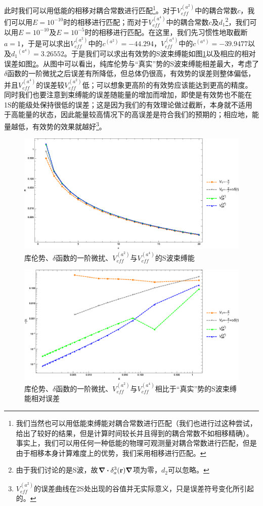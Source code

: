 \documentclass[cs4size,titlepage,twoside]{ctexart}
\begin{document}
此时我们可以用低能的相移对耦合常数进行匹配\footnote{我们当然也可以用低能束缚能对耦合常数进行匹配（我们也进行过这种尝试，给出了较好的结果，但是计算时间较长并且得到的耦合常数不如相移精确）。事实上，我们可以用任何一种低能的物理可观测量对耦合常数进行匹配，但是由于相移本身计算难度上的优势，我们采用相移进行匹配。}。对于$V_{eff}^{(a^2)}$中的耦合常数$c$，我们可以用$E=10^{-10}$时的相移进行匹配；而对于$V_{eff}^{(a^4)}$中的耦合常数$c$及$d_1$\footnote{由于我们讨论的是S波，故$\div{\delta_a^3(\vb{r})}\grad$项为零，$d_2$可以忽略。}，我们可以用$E=10^{-10}$及$E=10^{-5}$时的相移进行匹配。在这里，我们先习惯性地取截断$a=1$，于是可以求出$V_{eff}^{(a^2)}$中的$ c^{(a^2)}=-44.294$，$V_{eff}^{(a^4)}$中的$c^{(a^4)}=-39.9477$以及${d_1}^{(a^4)}=3.26552$。于是我们可以求出有效势的S波束缚能如图\ref{Swaveenergy}以及相应的相对误差如图\ref{Swaveenergyerror}。从图中可以看出，纯库伦势与“真实”势的S波束缚能相差最大，考虑了$\delta$函数的一阶微扰之后误差有所降低，但总体仍很高，有效势的误差则整体偏低，并且$V_{eff}^{(a^4)}$的误差较$V_{eff}^{(a^2)}$低；可以想象更高阶的有效势应该能达到更高的精度。同时我们也要注意到束缚能的误差随能量的增加而增加，即使是有效势也不能在1S的能级处保持很低的误差；这是因为我们的有效理论做过截断，本身就不适用于高能量的状态，因此能量较高情况下的高误差是符合我们的预期的；相应地，能量越低，有效势的效果就越好\footnote{$V_{eff}^{(a^2)}$的误差曲线在2S处出现的谷值并无实际意义，只是误差符号变化所引起的。}。
\begin{figure}[!htbp]
	\centering
	\includegraphics[width=6in]{Test_PS_CurveFitting_Figure2_1.eps}
	\caption{库伦势、$\delta$函数的一阶微扰、$V_{eff}^{(a^2)}$与$V_{eff}^{(a^4)}$的S波束缚能}\label{Swaveenergy}
\end{figure}
\begin{figure}[!htbp]
	\centering
	\includegraphics[width=6in]{Test_PS_CurveFitting_Figure2.eps}
	\caption{库伦势、$\delta$函数的一阶微扰、$V_{eff}^{(a^2)}$与$V_{eff}^{(a^4)}$相比于“真实”势的S波束缚能相对误差}\label{Swaveenergyerror}
\end{figure}
\end{document}
